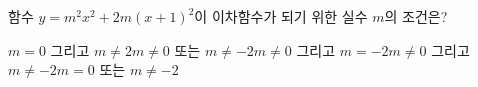함수 $y=m^2x^2+2m(x+1)^2$이 이차함수가 되기 위한 실수 $m$의 조건은?
\begin{choicesv}{$m=0$ 그리고 $m\ne 2$}{$m\ne 0$ 또는 $m\ne -2$}{$m\ne 0$ 그리고 $m=-2$}{$m\ne 0$ 그리고 $m\ne -2$}{$m=0$ 또는 $m\ne -2$}\end{choicesv}

